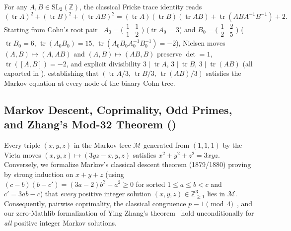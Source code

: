 \documentclass[11pt,reqno]{amsart}
\theoremstyle{plain}
\theoremstyle{definition}
\newcommand{\ZZ}{\mathbb{Z}}
\newcommand{\SL}{\mathrm{SL}}
\newcommand{\code}[1]{\texttt{\detokenize{#1}}}
\begin{document}
For any $A, B \in \SL_2(\ZZ)$, the classical Fricke trace identity reads
\begin{equation}
  (\operatorname{tr} A)^2 + (\operatorname{tr} B)^2 + (\operatorname{tr} AB)^2 = (\operatorname{tr} A)(\operatorname{tr} B)(\operatorname{tr} AB) + \operatorname{tr}(ABA^{-1}B^{-1}) + 2.
\end{equation}
Starting from Cohn's root pair~\cite{cohn1955} $A_0 = \bigl(\begin{smallmatrix} 1 & 1 \\ 1 & 2 \end{smallmatrix}\bigr)$ ($\operatorname{tr} A_0 = 3$) and $B_0 = \bigl(\begin{smallmatrix} 1 & 2 \\ 2 & 5 \end{smallmatrix}\bigr)$ ($\operatorname{tr} B_0 = 6$, $\operatorname{tr}(A_0 B_0) = 15$, $\operatorname{tr}(A_0 B_0 A_0^{-1} B_0^{-1}) = -2$), Nielsen moves $(A,B) \mapsto (A, AB)$ and $(A,B) \mapsto (AB, B)$ preserve $\det = 1$, $\operatorname{tr}([A,B]) = -2$, and explicit divisibility $3 \mid \operatorname{tr} A$, $3 \mid \operatorname{tr} B$, $3 \mid \operatorname{tr}(AB)$ (all exported in \code{T3a}), establishing that $(\operatorname{tr} A/3,\, \operatorname{tr} B/3,\, \operatorname{tr}(AB)/3)$ satisfies the Markov equation at every node of the binary Cohn tree.

\subsection{Markov Descent, Coprimality, Odd Primes, and Zhang's Mod-32 Theorem (\texorpdfstring{\code{T3b}}{T3b})}

Every triple $(x,y,z)$ in the Markov tree $\mathcal{M}$ generated from $(1,1,1)$ by the Vieta moves $(x,y,z) \mapsto (3yz-x, y, z)$ satisfies $x^2 + y^2 + z^2 = 3xyz$. Conversely, we formalize Markov's classical descent theorem (1879/1880) proving by strong induction on $x+y+z$ (using $(c-b)(b-c') = (3a-2)b^2 - a^2 \ge 0$ for sorted $1 \le a \le b < c$ and $c' = 3ab - c$) that \emph{every} positive integer solution $(x,y,z) \in \ZZ_{\ge 1}^3$ lies in $\mathcal{M}$. Consequently, pairwise coprimality, the classical congruence $p \equiv 1 \pmod 4$~\cite{aigner2013}, and our zero-Mathlib formalization of Ying Zhang's theorem~\cite{zhang2007} hold unconditionally for \emph{all} positive integer Markov solutions.
\end{document}
